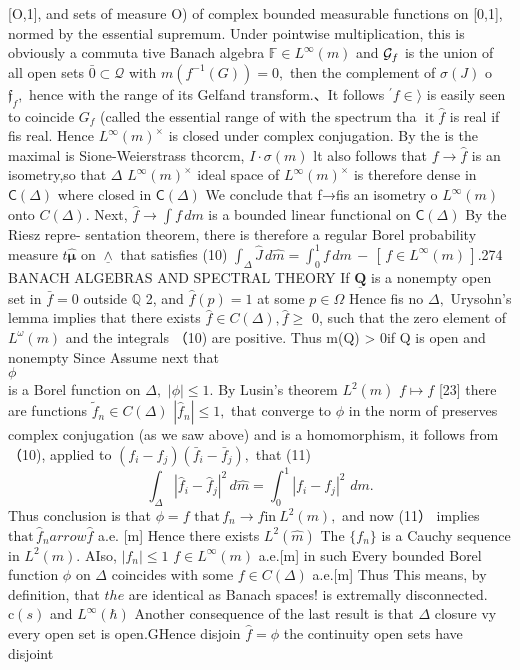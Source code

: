 [O,1], and sets of measure O) of complex bounded measurable functions on [0,1], normed by the essential supremum. Under pointwise multiplication, this is obviously a commuta tive Banach algebra $\mathbb{F}\in L^{\infty}(m)$ and ${\cal G}_{f}$ is the union of all open sets ${\bar{0}}\subset{\mathcal{Q}}$ with $m({f}^{-1}(G))=0,$ then the complement of $\sigma(J)$ o ${\mathfrak{f}}_{f},$ hence with the range of its Gelfand transform.、It follows ${}^{'}\!f\!\!\!\in\!\rangle$ is easily seen to coincide $G_{f}$ (called the essential range of with the spectrum tha $\operatorname{it}{\hat{f}}$ is real if fis real. Hence $L^{\infty}(m)^{\times}$ is closed under complex conjugation. By the is the maximal is Sione-Weierstrass thcorcm, $\scriptstyle I\cdot\sigma(m)$ lt also follows that $f\to{\hat{f}}$ is an isometry,so that $\Delta$ $L^{\infty}(m)^{\times}$ ideal space of $L^{\infty}(m)^{\times}$ is therefore dense in ${\mathsf{C}}(\Delta)$ where closed in ${\mathsf{C}}(\Delta)$ We conclude that f→fis an isometry o $L^{\infty}(m)$ onto $C(\Delta).$ Next, ${\widehat{f}}\to\int f\,d m$ is a bounded linear functional on ${\mathsf{C}}(\Delta)$ By the Riesz repre- sentation theorem, there is therefore a regular Borel probability measure $t{\hat{\boldsymbol{\mu}}}$ on $\underline{{\land}}$ that satisfies (10) $\int_{\Delta}^{}{\hat{J}}\,d{\hat{m}}=\int_{0}^{1}\!f\,d m\,-\,\left[\,f\in L^{\infty}(m)\,\right].$274 BANACH ALGEBRAS AND SPECTRAL THEORY If $\underline{{\mathbf{Q}}}$ is a nonempty open set in ${\bar{f}}=0$ outside $\mathbb{Q}$ 2, and ${\hat{f}}(p)=1$ at some $p\in\Omega$ Hence fis no $\textstyle\Delta,$ Urysohn's lemma implies that there exists ${\hat{f}}\in C(\Delta),{\hat{f}}\geq$ 0, such that the zero element of $L^{\omega}(m)$ and the integrals （10) are positive. Thus m(Q) > 0if Q is open and nonempty Since Assume next that $\phi~~~~~~~~~~~~~~~~~~~~~~~~~~~~~~~~~~~~~~~~~~~~~~~~~~~~~~~~~~~~~~~~~~~~~~~~~~~~~~~~~~~~~~~~~~~~~~~~~~~~~~~~~~~~~~~~~~~~~~~~~~~~~~~~~~~~~~~~~~~~~~~~~~~~~~~~~~~~~~~~~~~~~~~~~~~~~~~~~~~~~~~~~~~~~~~~~~~~~~~~~~~$ is a Borel function on $\Delta,$ $|\phi|\leq1.$ By Lusin's theorem $L^{2}({\hat{m}})$ $f{\boldsymbol{\mapsto}}f$ [23] there are functions ${\tilde{f}}_{n}\in C(\Delta)$ $|\hat{f}_{n}|\leq1,$ that converge to $\phi$ in the norm of preserves complex conjugation (as we saw above) and is a homomorphism, it follows from （10), applied to $(f_{i}-f_{j})({\bar{f}}_{i}-{\bar{f}}_{j}),$ that (11) $$ \int_{\Delta}|\hat{f}_{i}-\hat{f}_{j}|^{2}\,d\hat{m}=\int_{0}^{1}|f_{i}-f_{j}|^{2}\,\,d m. $$ Thus conclusion is that $\phi=f$ $\mathrm{that}\,f_{n}{\to}f\mathrm{in~}L^{2}(m),$ and now (11） implies $\mathrm{that}\,\hat{f}_{n} arrow\hat{f}$ a.e. [m] Hence there exists $L^{2}({\hat{m}})$ The $\scriptstyle\{f_{n}\}$ is a Cauchy sequence in $L^{2}(m).$ AIso, $|f_{n}|\leq1$ $f\in L^{\infty}(m)$ a.e.[m] in such Every bounded Borel function $\phi$ on $\Delta$ coincides with some $f\in C(\Delta)$ a.e.[m] Thus This means, by definition, that $t h e$ are identical as Banach spaces! is extremally disconnected. ${\mathrm{c}}(s)$ and $L^{\infty}(\hbar)$ Another consequence of the last result is that $\Delta$ closure vy every open set is open.GHence disjoin ${\hat{f}}=\phi$ the continuity open sets have disjoint 